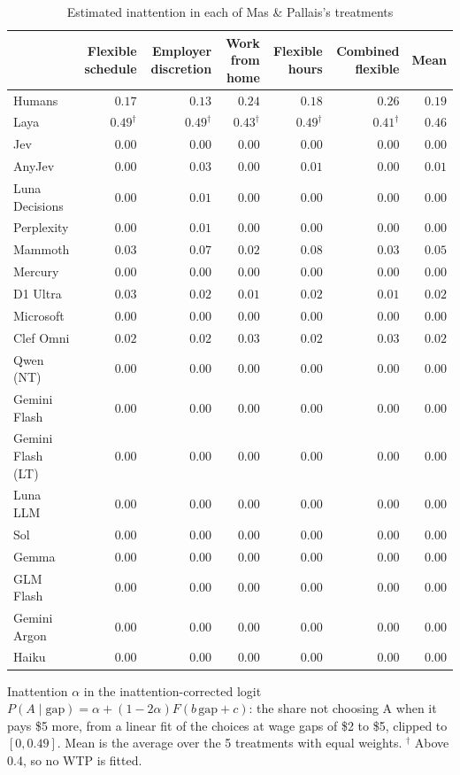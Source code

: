 \begin{table}[htbp]
\centering
\caption{Estimated inattention in each of Mas \& Pallais's treatments}
\label{tab:mas_pallais_inattention}
\begin{tabular}{lrrrrrr}
\toprule
 & Flexible schedule & Employer discretion & Work from home & Flexible hours & Combined flexible & Mean \\
\midrule
Humans & $0.17$ & $0.13$ & $0.24$ & $0.18$ & $0.26$ & $0.19$ \\
\midrule
Laya & $0.49^{\dagger}$ & $0.49^{\dagger}$ & $0.43^{\dagger}$ & $0.49^{\dagger}$ & $0.41^{\dagger}$ & $0.46$ \\
Jev & $0.00$ & $0.00$ & $0.00$ & $0.00$ & $0.00$ & $0.00$ \\
AnyJev & $0.00$ & $0.03$ & $0.00$ & $0.01$ & $0.00$ & $0.01$ \\
Luna Decisions & $0.00$ & $0.01$ & $0.00$ & $0.00$ & $0.00$ & $0.00$ \\
Perplexity & $0.00$ & $0.01$ & $0.00$ & $0.00$ & $0.00$ & $0.00$ \\
Mammoth & $0.03$ & $0.07$ & $0.02$ & $0.08$ & $0.03$ & $0.05$ \\
Mercury & $0.00$ & $0.00$ & $0.00$ & $0.00$ & $0.00$ & $0.00$ \\
D1 Ultra & $0.03$ & $0.02$ & $0.01$ & $0.02$ & $0.01$ & $0.02$ \\
Microsoft & $0.00$ & $0.00$ & $0.00$ & $0.00$ & $0.00$ & $0.00$ \\
Clef Omni & $0.02$ & $0.02$ & $0.03$ & $0.02$ & $0.03$ & $0.02$ \\
\midrule
Qwen (NT) & $0.00$ & $0.00$ & $0.00$ & $0.00$ & $0.00$ & $0.00$ \\
Gemini Flash & $0.00$ & $0.00$ & $0.00$ & $0.00$ & $0.00$ & $0.00$ \\
Gemini Flash (LT) & $0.00$ & $0.00$ & $0.00$ & $0.00$ & $0.00$ & $0.00$ \\
Luna LLM & $0.00$ & $0.00$ & $0.00$ & $0.00$ & $0.00$ & $0.00$ \\
Sol & $0.00$ & $0.00$ & $0.00$ & $0.00$ & $0.00$ & $0.00$ \\
Gemma & $0.00$ & $0.00$ & $0.00$ & $0.00$ & $0.00$ & $0.00$ \\
GLM Flash & $0.00$ & $0.00$ & $0.00$ & $0.00$ & $0.00$ & $0.00$ \\
Gemini Argon & $0.00$ & $0.00$ & $0.00$ & $0.00$ & $0.00$ & $0.00$ \\
Haiku & $0.00$ & $0.00$ & $0.00$ & $0.00$ & $0.00$ & $0.00$ \\
\bottomrule
\end{tabular}
\par\smallskip
\parbox{\linewidth}{\footnotesize Inattention $\alpha$ in the inattention-corrected logit $P(A \mid \text{gap}) = \alpha + (1 - 2\alpha) F(b\,\text{gap} + c)$: the share not choosing A when it pays \$5 more, from a linear fit of the choices at wage gaps of \$2 to \$5, clipped to $[0, 0.49]$. Mean is the average over the 5 treatments with equal weights. $^{\dagger}$ Above 0.4, so no WTP is fitted.}
\end{table}
